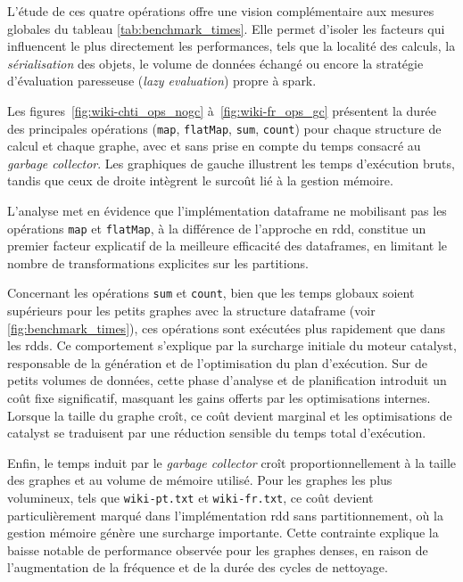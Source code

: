 \documentclass[conference]{IEEEtran}
\begin{document}
L'étude de ces quatre opérations offre une vision complémentaire aux mesures globales du tableau \autoref{tab:benchmark_times}.  
Elle permet d'isoler les facteurs qui influencent le plus directement les performances, tels que la localité des calculs, la \textit{sérialisation} des objets, le volume de données échangé ou encore la stratégie d'évaluation paresseuse (\textit{lazy evaluation}) propre à \gls{spark}.

Les figures~\ref{fig:wiki-chti_ops_nogc} à~\ref{fig:wiki-fr_ops_gc} présentent la durée des principales opérations (\texttt{map}, \texttt{flatMap}, \texttt{sum}, \texttt{count}) pour chaque structure de calcul et chaque graphe, avec et sans prise en compte du temps consacré au \textit{garbage collector}.  
Les graphiques de gauche illustrent les temps d'exécution bruts, tandis que ceux de droite intègrent le surcoût lié à la gestion mémoire.

L'analyse met en évidence que l'implémentation \gls{dataframe} ne mobilisant pas les opérations \texttt{map} et \texttt{flatMap}, à la différence de l'approche en \gls{rdd}, constitue un premier facteur explicatif de la meilleure efficacité des \glspl{dataframe}, en limitant le nombre de transformations explicites sur les partitions.

Concernant les opérations \texttt{sum} et \texttt{count}, bien que les temps globaux soient supérieurs pour les petits graphes avec la structure \gls{dataframe} (voir \autoref{fig:benchmark_times}), ces opérations sont exécutées plus rapidement que dans les \glspl{rdd}.  
Ce comportement s'explique par la surcharge initiale du moteur \gls{catalyst}, responsable de la génération et de l'optimisation du plan d'exécution.  
Sur de petits volumes de données, cette phase d'analyse et de planification introduit un coût fixe significatif, masquant les gains offerts par les optimisations internes.  
Lorsque la taille du graphe croît, ce coût devient marginal et les optimisations de \gls{catalyst} se traduisent par une réduction sensible du temps total d'exécution.

Enfin, le temps induit par le \textit{garbage collector} croît proportionnellement à la taille des graphes et au volume de mémoire utilisé.  
Pour les graphes les plus volumineux, tels que \texttt{wiki-pt.txt} et \texttt{wiki-fr.txt}, ce coût devient particulièrement marqué dans l'implémentation \gls{rdd} sans partitionnement, où la gestion mémoire génère une surcharge importante.  
Cette contrainte explique la baisse notable de performance observée pour les graphes denses, en raison de l'augmentation de la fréquence et de la durée des cycles de nettoyage.
\end{document}
